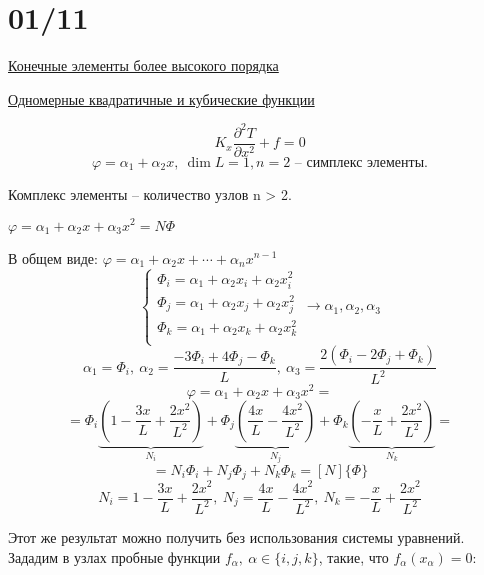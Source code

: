 \documentclass{bmstu}
\begin{document}
\section*{01/11}
\begin{center}
\underline{Конечные элементы более высокого порядка}

\underline{Одномерные квадратичные и кубические функции}
\end{center}
\[
K_x \frac{\partial^2 T}{\partial x^2} + f = 0
\]
\[
\varphi = \alpha_1 + \alpha_2x, \ \dim L = 1, n = 2 \text{ -- симплекс элементы.}
\]

Комплекс элементы -- количество узлов n > 2.  

\begin{center}
\end{center}

$\varphi = \alpha_1 + \alpha_2x + \alpha_3x^2 = N \Phi$

В общем виде: $\varphi = \alpha_1 + \alpha_2x + \cdots + \alpha_nx^{n-1}$
\[
\begin{cases}
\Phi_i = \alpha_1 + \alpha_2x_i + \alpha_2x^{2}_i \\
\Phi_j = \alpha_1 + \alpha_2x_j + \alpha_2x^{2}_j \\
\Phi_k = \alpha_1 + \alpha_2x_k + \alpha_2x^{2}_k \\
\end{cases}
\rightarrow \alpha_1, \alpha_2, \alpha_3
\]
\[
\alpha_1 = \Phi_i, \ \alpha_2 = \frac{-3\Phi_i + 4\Phi_j -\Phi_k}{L}, \ \alpha_3 = \frac{2(\Phi_i-2\Phi_j+\Phi_k)}{L^2}
\]
\[
\varphi = \alpha_1 + \alpha_2x + \alpha_3x^2 = 
\]
\[
 = \Phi_i   \underbrace{\left(1 - \frac{3x}{L} + \frac{2x^2}{L^2} \right) }_{N_i}   + \Phi_j \underbrace{\left(\frac{4x}{L} - \frac{4x^2}{L^2} \right)}_{N_j} + \Phi_k \underbrace{\left(-\frac{x}{L} + \frac{2x^2}{L^2} \right)}_{N_k} = 
\]
\[
 = N_i \Phi_i + N_j \Phi_j + N_k \Phi_k = [N]\{\Phi\}
\]
\[
N_i = 1 - \frac{3x}{L} + \frac{2x^2}{L^2}, \ N_j = \frac{4x}{L} - \frac{4x^2}{L^2}, \ N_k = -\frac{x}{L} + \frac{2x^2}{L^2}
\]

Этот же результат можно получить без использования системы уравнений. Зададим в узлах пробные функции $f_{\alpha},\ \alpha \in \{i, j, k\}$, такие, что $f_{\alpha}(x_{\alpha}) = 0$:
\end{document}
